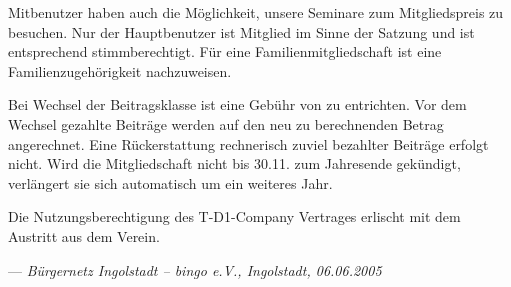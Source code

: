 Mitbenutzer haben auch die Möglichkeit, unsere Seminare zum Mitgliedspreis zu besuchen.
Nur der Hauptbenutzer ist Mitglied im Sinne der Satzung und ist entsprechend stimmberechtigt.
Für eine Familienmitgliedschaft ist eine Familienzugehörigkeit nachzuweisen.

Bei Wechsel der Beitragsklasse ist eine Gebühr von   zu entrichten.
Vor dem Wechsel gezahlte Beiträge werden auf den neu zu berechnenden Betrag angerechnet.
Eine Rückerstattung rechnerisch zuviel bezahlter Beiträge erfolgt nicht.
Wird die Mitgliedschaft nicht bis 30.11. zum Jahresende gekündigt,
verlängert sie sich automatisch um ein weiteres Jahr.

Die Nutzungsberechtigung des T-D1-Company Vertrages erlischt mit dem Austritt aus dem Verein.

\hfill --- \textit{Bürgernetz Ingolstadt -- bingo e.V., Ingolstadt, 06.06.2005}
\newpage
